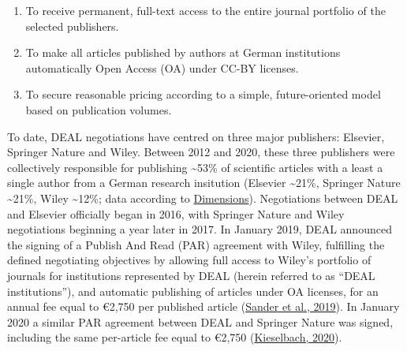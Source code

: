 \documentclass[
]{article}
\providecommand{\tightlist}{%
  \setlength{\itemsep}{0pt}\setlength{\parskip}{0pt}}
\begin{document}
\begin{enumerate}
\def\labelenumi{\arabic{enumi}.}
\tightlist
\item
  To receive permanent, full-text access to the entire journal portfolio of the selected publishers.
\item
  To make all articles published by authors at German institutions automatically Open Access (OA) under CC-BY licenses.
\item
  To secure reasonable pricing according to a simple, future-oriented model based on publication volumes.
\end{enumerate}

To date, DEAL negotiations have centred on three major publishers: Elsevier, Springer Nature and Wiley. Between 2012 and 2020, these three publishers were collectively responsible for publishing \textasciitilde53\% of scientific articles with a least a single author from a German research insitution (Elsevier \textasciitilde21\%, Springer Nature \textasciitilde21\%, Wiley \textasciitilde12\%; data according to \href{https://www.dimensions.ai/}{Dimensions}). Negotiations between DEAL and Elsevier officially began in 2016, with Springer Nature and Wiley negotiations beginning a year later in 2017. In January 2019, DEAL announced the signing of a Publish And Read (PAR) agreement with Wiley, fulfilling the defined negotiating objectives by allowing full access to Wiley's portfolio of journals for institutions represented by DEAL (herein referred to as ``DEAL institutions''), and automatic publishing of articles under OA licenses, for an annual fee equal to €2,750 per published article (\href{https://doi.org/10.17617/2.3027595}{Sander et al., 2019}). In January 2020 a similar PAR agreement between DEAL and Springer Nature was signed, including the same per-article fee equal to €2,750 (\href{https://doi.org/10.17617/2.3174351}{Kieselbach, 2020}).
\end{document}
